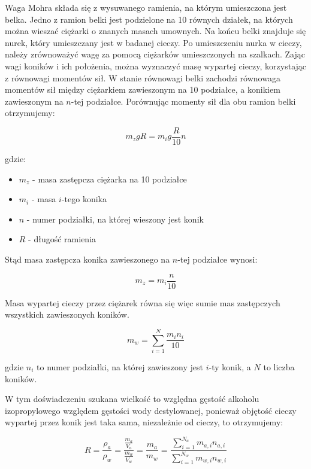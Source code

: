 \documentclass[a4paper,12pt]{article}
\begin{document}
Waga Mohra składa się z wysuwanego ramienia, na którym umieszczona jest belka. Jedno z ramion belki jest podzielone na 10 równych działek, na których można wieszać ciężarki o znanych masach umownych. Na końcu belki znajduje się nurek, który umieszczany jest w badanej cieczy. Po umieszczeniu nurka w cieczy, należy zrównoważyć wagę za pomocą ciężarków umieszczonych na szalkach. Zając wagi koników i ich położenia, można wyznaczyć masę wypartej cieczy, korzystając z równowagi momentów sił.
W stanie równowagi belki zachodzi równowaga momentów sił między ciężarkiem zawieszonym na 10 podziałce, a konikiem zawieszonym na $n$-tej podziałce. Porównując momenty sił dla obu ramion belki otrzymujemy:

\begin{equation*}
    m_z gR = m_i g \frac{R}{10} n
\end{equation*}

gdzie:
\begin{itemize}
    \item $m_z$ - masa zastępcza ciężarka na 10 podziałce
    \item $m_i$ - masa $i$-tego konika
    \item $n$ - numer podziałki, na której wieszony jest konik
    \item $R$ - długość ramienia
\end{itemize}

Stąd masa zastępcza konika zawieszonego na $n$-tej podziałce wynosi:

\begin{equation*}
    m_z = m_i \frac{n}{10}
\end{equation*}

Masa wypartej cieczy przez ciężarek równa się więc sumie mas zastępczych wszystkich zawieszonych koników.

\begin{equation}
    \label{eq:waga_mohra}
    m_w = \sum_{i=1}^{N} \frac{m_i n_i}{10}
\end{equation}

gdzie $n_i$ to numer podziałki, na której zawieszony jest $i$-ty konik, a $N$ to liczba koników.


W tym doświadczeniu szukana wielkość to względna gęstość alkoholu izopropylowego względem gęstości wody destylowanej, ponieważ objętość cieczy wypartej przez konik jest taka sama, niezależnie od cieczy, to otrzymujemy:

\begin{equation}
    \label{eq:wzgledna_gestosc}
    R = \frac{\rho_a}{\rho_w} = \frac{\frac{m_a}{V_a}}{\frac{m_w}{V_w}} = \frac{m_a}{m_w} = \frac{\sum_{i=1}^{N_a} m_{a,i} n_{a,i}}{\sum_{i=1}^{N_w} m_{w,i} n_{w,i}}
\end{equation}
\end{document}
